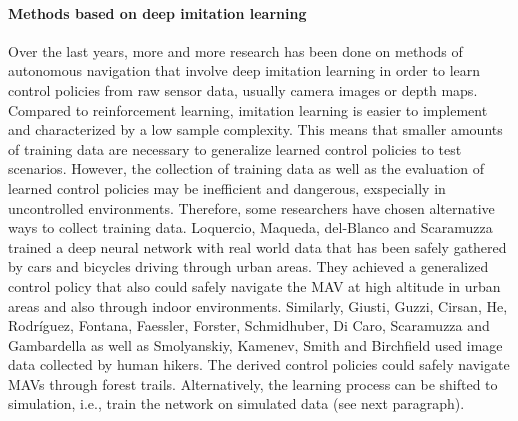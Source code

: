 \paragraph{Methods based on deep imitation learning}





Over the last years, more and more research has been done on methods of autonomous navigation
that involve deep imitation learning in order to learn control policies from raw sensor data, usually camera images or depth maps.  %
Compared to reinforcement learning, imitation learning is easier to implement and characterized by a low sample complexity. 
This means that smaller amounts of training data are necessary to generalize learned control policies to test scenarios.
However, the collection of training data as well as the evaluation of learned control policies
may be inefficient and dangerous, exspecially in uncontrolled environments.
Therefore, some researchers have chosen alternative ways to collect training data.
Loquercio, Maqueda, del-Blanco and Scaramuzza \cite{Loquercio2018} trained a deep neural network 
with real world data that has been safely gathered by cars and bicycles driving through urban areas.
They achieved a generalized control policy 
that also could safely navigate the MAV at high altitude in urban areas and also through indoor environments.
Similarly, Giusti, Guzzi, Cirsan, He, Rodríguez, Fontana, Faessler, Forster, Schmidhuber, Di Caro, Scaramuzza and Gambardella \cite{Giusti2016}
as well as Smolyanskiy, Kamenev, Smith and Birchfield \cite{Smolyanskiy2017} used image data collected by human hikers.
The derived control policies could safely navigate MAVs through forest trails.
Alternatively, the learning process can be shifted to simulation, i.e., train the network on simulated data (see next paragraph).

